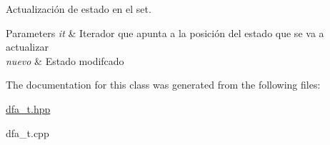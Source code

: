 Actualización de estado en el set. 


\begin{DoxyParams}{Parameters}
{\em it} & Iterador que apunta a la posición del estado que se va a actualizar \\
\hline
{\em nuevo} & Estado modifcado \\
\hline
\end{DoxyParams}


The documentation for this class was generated from the following files\+:\begin{DoxyCompactItemize}
\item 
\hyperlink{dfa__t_8hpp}{dfa\+\_\+t.\+hpp}\item 
dfa\+\_\+t.\+cpp\end{DoxyCompactItemize}
